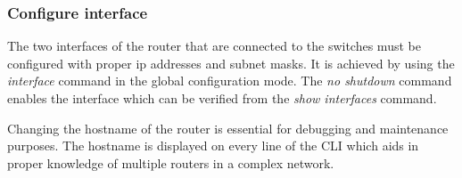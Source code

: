 \documentclass{lab_sheet}
\newcommand{\syntax}[2]{
    
}
\begin{document}
    \subsubsection*{Configure interface}
    The two interfaces of the router that are connected to the switches must be configured with proper ip addresses and subnet masks. It is achieved by using the \textit{interface} command in the global configuration mode. The \textit{no shutdown} command enables the interface which can be verified from the \textit{show interfaces} command.
    \syntax{in}{configuring interface}
    Changing the hostname of the router is essential for debugging and maintenance purposes. The hostname is displayed on every line of the CLI which aids in proper knowledge of multiple routers in a complex network.
\end{document}
